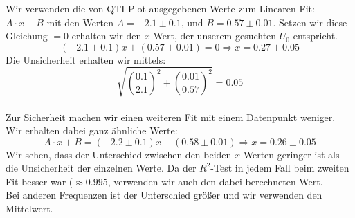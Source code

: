 \documentclass[12pt,a4paper,twopage]{article}
\begin{document}
Wir verwenden die von QTI-Plot ausgegebenen Werte zum Linearen Fit:\\
$A\cdot x +B$ mit den Werten $A=-2.1 \pm 0.1$, und $B=0.57 \pm 0.01$. Setzen wir diese Gleichung $=0$ erhalten wir den $x$-Wert, der unserem gesuchten $U_0$ entspricht.
$$(-2.1 \pm 0.1)x+(0.57 \pm 0.01)=0 \Rightarrow x=0.27 \pm 0.05$$
Die Unsicherheit erhalten wir mittels:
$$\sqrt{\left( \frac{0.1}{2.1} \right)^2 + \left( \frac{0.01}{0.57} \right)^2}=0.05$$
\\
Zur Sicherheit machen wir einen weiteren Fit mit einem Datenpunkt weniger. Wir erhalten dabei ganz ähnliche Werte:
$$A\cdot x+B=(-2.2 \pm 0.1)x+(0.58 \pm 0.01) \Rightarrow x=0.26 \pm 0.05$$
Wir sehen, dass der Unterschied zwischen den beiden $x$-Werten geringer ist als die Unsicherheit der einzelnen Werte. Da der $R^2$-Test in jedem Fall beim zweiten Fit besser war ($\approx 0.995$, verwenden wir auch den dabei berechneten Wert.\\
Bei anderen Frequenzen ist der Unterschied größer und wir verwenden den Mittelwert.
\\
\end{document}
